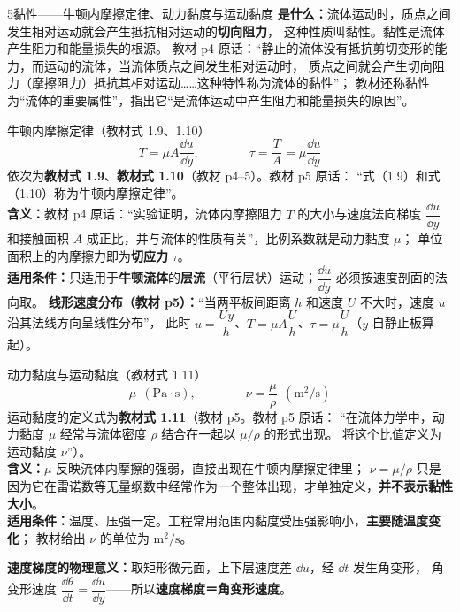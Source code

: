 \begin{kaodian}{5}{黏性——牛顿内摩擦定律、动力黏度与运动黏度}
\textbf{是什么：}流体运动时，质点之间发生相对运动就会产生抵抗相对运动的\textbf{切向阻力}，
这种性质叫黏性。黏性是流体产生阻力和能量损失的根源。
教材 p4 原话：“静止的流体没有抵抗剪切变形的能力，而运动的流体，当流体质点之间发生相对运动时，
质点之间就会产生切向阻力（摩擦阻力）抵抗其相对运动……这种特性称为流体的黏性”；
教材还称黏性为“流体的重要属性”，指出它“是流体运动中产生阻力和能量损失的原因”。

\begin{gongshi}{牛顿内摩擦定律（教材式 1.9、1.10）}
\[ T=\mu A\frac{\dd u}{\dd y},\qquad\qquad \tau=\frac{T}{A}=\mu\frac{\dd u}{\dd y} \]
\noindent 依次为\textbf{教材式 1.9}、\textbf{教材式 1.10}（教材 p4--5）。教材 p5 原话：
“式（1.9）和式（1.10）称为牛顿内摩擦定律”。\\
\textbf{含义：}教材 p4 原话：“实验证明，流体内摩擦阻力 $T$ 的大小与速度法向梯度 $\dfrac{\dd u}{\dd y}$
和接触面积 $A$ 成正比，并与流体的性质有关”，比例系数就是动力黏度 $\mu$；
单位面积上的内摩擦力即为\textbf{切应力} $\tau$。\\
\textbf{适用条件：}只适用于\textbf{牛顿流体}的\textbf{层流}（平行层状）运动；$\dfrac{\dd u}{\dd y}$ 必须按速度剖面的法向取。
\textbf{线形速度分布（教材 p5）：}“当两平板间距离 $h$ 和速度 $U$ 不大时，速度 $u$ 沿其法线方向呈线性分布”，
此时 $u=\dfrac{U y}{h}$、$T=\mu A\dfrac{U}{h}$、$\tau=\mu\dfrac{U}{h}$（$y$ 自静止板算起）。
\end{gongshi}

\begin{gongshi}{动力黏度与运动黏度（教材式 1.11）}
\[ \mu\ \ (\mathrm{Pa\cdot s}),\qquad\qquad \nu=\frac{\mu}{\rho}\ \ (\mathrm{m^2/s}) \]
\noindent 运动黏度的定义式为\textbf{教材式 1.11}（教材 p5。教材 p5 原话：
“在流体力学中，动力黏度 $\mu$ 经常与流体密度 $\rho$ 结合在一起以 $\mu/\rho$ 的形式出现。
将这个比值定义为运动黏度 $\nu$”）。\\
\textbf{含义：}$\mu$ 反映流体内摩擦的强弱，直接出现在牛顿内摩擦定律里；
$\nu=\mu/\rho$ 只是因为它在雷诺数等无量纲数中经常作为一个整体出现，才单独定义，\textbf{并不表示黏性大小}。\\
\textbf{适用条件：}温度、压强一定。工程常用范围内黏度受压强影响小，\textbf{主要随温度变化}；
教材给出 $\nu$ 的单位为 $\mathrm{m^2/s}$。
\end{gongshi}

\textbf{速度梯度的物理意义：}取矩形微元面，上下层速度差 $\dd u$，经 $\dd t$ 发生角变形，
角变形速度 $\dfrac{\dd\theta}{\dd t}=\dfrac{\dd u}{\dd y}$——所以\textbf{速度梯度＝角变形速度}。


\end{kaodian}
